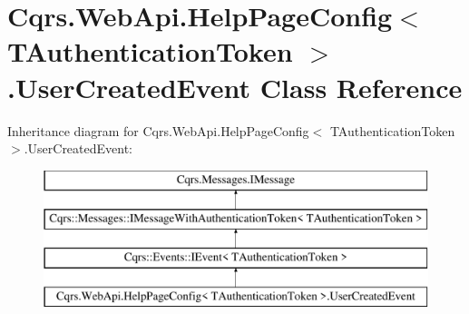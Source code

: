 \hypertarget{classCqrs_1_1WebApi_1_1HelpPageConfig_1_1UserCreatedEvent}{}\section{Cqrs.\+Web\+Api.\+Help\+Page\+Config$<$ T\+Authentication\+Token $>$.User\+Created\+Event Class Reference}
\label{classCqrs_1_1WebApi_1_1HelpPageConfig_1_1UserCreatedEvent}
Inheritance diagram for Cqrs.\+Web\+Api.\+Help\+Page\+Config$<$ T\+Authentication\+Token $>$.User\+Created\+Event\+:\begin{figure}[H]
\begin{center}
\leavevmode
\includegraphics[height=4.000000cm]{classCqrs_1_1WebApi_1_1HelpPageConfig_1_1UserCreatedEvent}
\end{center}
\end{figure}
